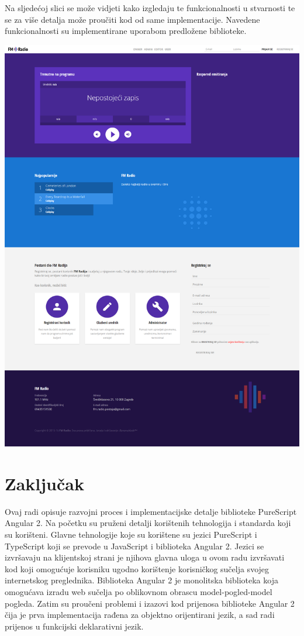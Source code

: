 \documentclass[times, utf8, zavrsni]{fer}
\begin{document}
Na sljedećoj slici se može vidjeti kako izgledaju te funkcionalnosti u stvarnosti te se za više detalja može proučiti kod od same implementacije. Navedene funkcionalnosti su implementirane uporabom predložene biblioteke.

\includegraphics[width=\textwidth]{full_frontpage.png}

\chapter{Zaključak}
Ovaj radi opisuje razvojni proces i implementacijske detalje biblioteke PureScript Angular 2. Na početku su pruženi detalji korištenih tehnologija i standarda koji su korišteni. Glavne tehnologije koje su korištene su jezici PureScript i TypeScript koji se prevode u JavaScript i biblioteka Angular 2. Jezici se izvršavaju na klijentskoj strani je njihova glavna uloga u ovom radu izvršavati kod koji omogućuje korisniku ugodno korištenje korisničkog sučelja svojeg internetskog preglednika. Biblioteka Angular 2 je monolitska biblioteka koja omogućava izradu web sučelja po oblikovnom obrascu model-pogled-model pogleda. Zatim su proučeni problemi i izazovi kod prijenosa biblioteke Angular 2 čija je prva implementacija rađena za objektno orijentirani jezik, a sad radi prijenos u funkcijski deklarativni jezik.
\end{document}
